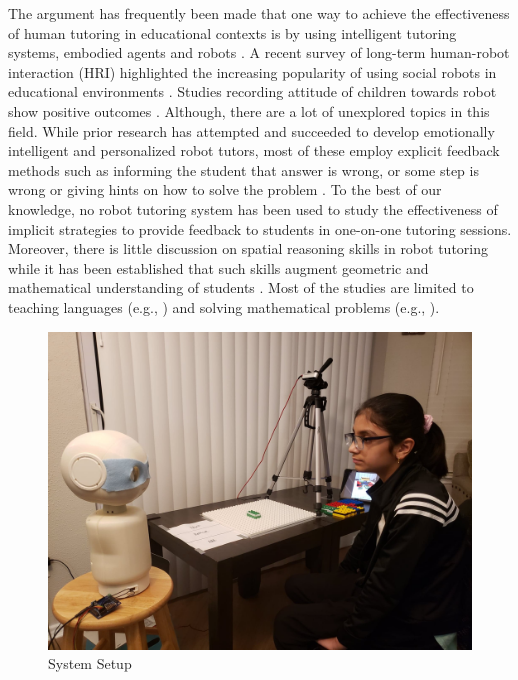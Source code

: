 The argument has frequently been made that one way to achieve the effectiveness of human tutoring in educational contexts is by using intelligent tutoring systems, embodied agents and robots \cite{intro1}. A recent survey of long-term human-robot interaction (HRI) highlighted the increasing popularity of using social robots in educational environments \cite{survey1}. Studies recording attitude of children towards robot show positive outcomes \cite{oh2010social}. Although, there are a lot of unexplored topics in this field. While prior research has attempted and succeeded to develop emotionally intelligent and personalized robot tutors, most of these employ explicit feedback methods such as informing the student that answer is wrong, or some step is wrong or giving hints on how to solve the problem \parencite{gordon2016affective}\parencite{ramachandran2019personalized}. To the best of our knowledge, no robot tutoring system has been used to study the effectiveness of implicit strategies to provide feedback to students in one-on-one tutoring sessions. Moreover, there is little discussion on spatial reasoning skills \parencite{yilmaz2017development} in robot tutoring while it has been established that such skills augment geometric and mathematical understanding of students \parencite{keren2012kindergarten}. Most of the studies are limited to teaching languages (e.g., \parencite{gordon2016affective}) and solving mathematical problems (e.g., \parencite{ramachandran2019personalized}). \\
\begin{figure}[h]
   \centering
   \includegraphics[width = 1\textwidth,trim={2cm 0 4cm 5cm},clip]{figures/s1.jpg}
   \caption[{System Setup}]{System Setup}
   \label{fig:fig_1-1}
\end{figure}

